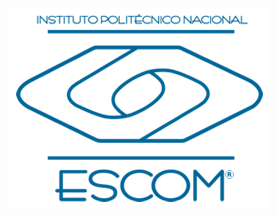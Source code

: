 \begin{center}
\begin{minipage}[b][0.2\textwidth][c]{0.2\textwidth}
    \includegraphics[width=\textwidth]{images/escom_logo.png}
\end{minipage}
\begin{minipage}[b][0.2\textwidth][c]{0.74\textwidth}
    \vskip 1cm
    \vskip 1cm
\end{minipage}
\end{center}

\setcounter{page}{1}
\normalsize
\newpage